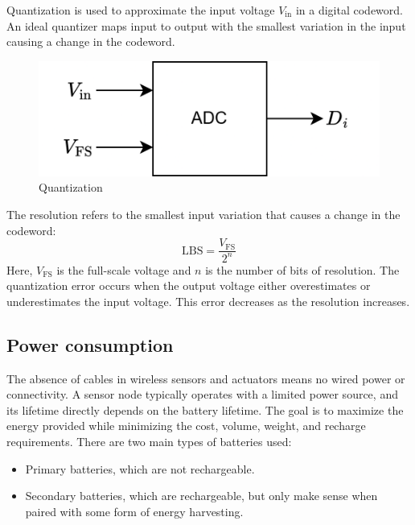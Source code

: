 Quantization is used to approximate the input voltage $V_{\text{in}}$ in a digital codeword. 
An ideal quantizer maps input to output with the smallest variation in the input causing a change in the codeword.
\begin{figure}[H]
    \centering
    \includegraphics[width=0.5\linewidth]{images/iot16.png}
    \caption{Quantization}
\end{figure}
\noindent The resolution refers to the smallest input variation that causes a change in the codeword:
\[\text{LBS}=\dfrac{V_{\text{FS}}}{2^n}\]
Here, $V_{\text{FS}}$ is the full-scale voltage and $n$ is the number of bits of resolution.
The quantization error occurs when the output voltage either overestimates or underestimates the input voltage. 
This error decreases as the resolution increases.

\subsection{Power consumption}
The absence of cables in wireless sensors and actuators means no wired power or connectivity. 
A sensor node typically operates with a limited power source, and its lifetime directly depends on the battery lifetime. 
The goal is to maximize the energy provided while minimizing the cost, volume, weight, and recharge requirements.
There are two main types of batteries used:
\begin{itemize}
    \item Primary batteries, which are not rechargeable.
    \item Secondary batteries, which are rechargeable, but only make sense when paired with some form of energy harvesting.
\end{itemize}

